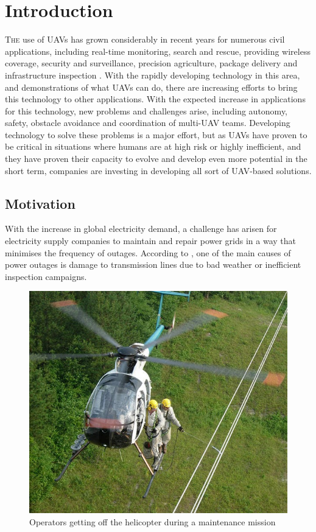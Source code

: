 \chapter{Introduction}
\label{ch:Introduction}
\lettrine[lraise=-0.1, lines=2, loversize=0.2]{T}{he} use of \glspl{UAV} has grown considerably in recent years for numerous civil applications, including real-time monitoring, search and rescue, providing wireless coverage, security and surveillance, precision agriculture, package delivery and infrastructure inspection \cite{CivilAplications}. With the rapidly developing technology in this area, and demonstrations of what \glspl{UAV} can do, there are increasing efforts to bring this technology to other applications. With the expected increase in applications for this technology, new problems and challenges arise, including autonomy, safety, obstacle avoidance and coordination of multi-\gls{UAV} teams. Developing technology to solve these problems is a major effort, but as \glspl{UAV} have proven to be critical in situations where humans are at high risk or highly inefficient, and they have proven their capacity to evolve and develop even more potential in the short term, companies are investing in developing all sort of \gls{UAV}-based solutions.

\section{Motivation}
\label{sec:Motivation}
With the increase in global electricity demand, a challenge has arisen for electricity supply companies to maintain and repair power grids in a way that minimises the frequency of outages. According to \cite{PowerOutagesCauses}, one of the main causes of power outages is damage to transmission lines due to bad weather or inefficient inspection campaigns.

\begin{figure}[htbp]
    \centering
    \includegraphics[width=0.6\linewidth]
    {Introduction/figures/helicopter.jpg}
    \caption{Operators getting off the helicopter during a maintenance mission}
    \label{fig:helicopter}
\end{figure}

